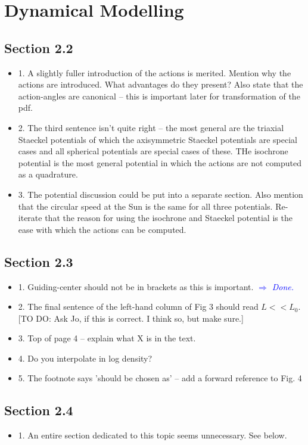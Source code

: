 \documentclass[10pt,a4paper]{article}
\newcommand{\Comment}[1]{\textsl{\textcolor{Blue}{$\Longrightarrow$ {#1}}}}
\newcommand{\Jo}[1]{\textcolor{YellowOrange}{#1}}
\begin{document}
\section{Dynamical Modelling}

\subsection{Section 2.2}
\begin{itemize}
\item 1. A slightly fuller introduction of the actions is merited. Mention why the actions are introduced. What advantages do they present? Also state that the action-angles are canonical -- this is important later for transformation of the pdf.
\item 2. The third sentence isn't quite right -- the most general are the triaxial
Staeckel potentials of which the axisymmetric Staeckel potentials are special cases
and all spherical potentials are special cases of these. THe isochrone potential is
the most general potential in which the actions are not computed as a quadrature.
\item 3. The potential discussion could be put into a separate section. Also mention that the circular speed at the Sun is the same for all three potentials. Re-iterate that the reason for using the isochrone and Staeckel potential is the ease with which the actions can be computed.
\end{itemize}

\subsection{Section 2.3}
\begin{itemize}
\item 1. Guiding-center should not be in brackets as this is important. \Comment{Done.}
\item 2. The final sentence of the left-hand column of Fig 3 should read $L<<L_0$. \Jo{[TO DO: Ask Jo, if this is correct. I think so, but make sure.]}
\item 3. Top of page 4 -- explain what X is in the text.
\item 4. Do you interpolate in log density?
\item 5. The footnote says 'should be chosen as' -- add a forward reference to Fig. 4
\end{itemize}

\subsection{Section 2.4}
\begin{itemize}
\item 1. An entire section dedicated to this topic seems unnecessary. See below.
\end{itemize}
\end{document}

